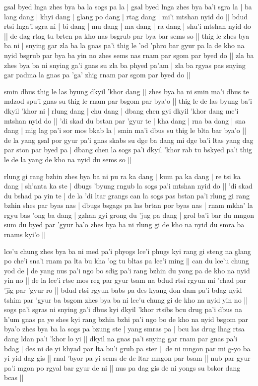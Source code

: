 \documentclass[11pt,twoside]{article}\makeatletter
\begin{document}
\label{TV18.1}gsal byed lnga zhes bya ba la sogs pa la | gsal byed lnga zhes bya ba'i sgra la | ba lang dang | khyi dang | glang po dang | rtag dang | mi'i mtshan nyid do || bdud rtsi lnga'i sgra ni | bi dang | mu dang | ma dang | ra dang | shu'i mtshan nyid do || de dag rtag tu brten pa kho nas bsgrub par bya bar sems so || thig le zhes bya ba ni | snying gar zla ba la gnas pa'i thig le 'od 'phro bar gyur pa la de kho na nyid bsgrub par bya ba yin no zhes sems nas rnam par sgom par byed do || zla ba zhes bya ba ni snying ga'i gnas su zla ba phyed pa'am | zla ba rgyas pas snying gar padma la gnas pa 'ga' zhig rnam par sgom par byed do || \par
\label{TV18.2}smin dbus thig le las byung dkyil 'khor dang || zhes bya ba ni smin ma'i dbus te mdzod spu'i gnas su thig le rnam par bsgom par bya'o || thig le de las byung ba'i dkyil 'khor ni | rlung dang | chu dang | dbang chen gyi dkyil 'khor dang me'i mtshan nyid do || 'di skad du bstan par 'gyur te | kha dang | rna ba dang | sna dang | mig lag pa'i sor mos bkab la | smin ma'i dbus su thig le blta bar bya'o || de la yang gsal por gyur pa'i gnas skabs su dge ba dang mi dge ba'i ltas yang dag par ston par byed pa | dbang chen la sogs pa'i dkyil 'khor rab tu bskyed pa'i thig le de la yang de kho na nyid du sems so || \par
\label{TV18.3}rlung gi rang bzhin zhes bya ba ni pu ra ka dang | kum pa ka dang | re tsi ka dang | sh'anta ka ste | dbugs 'byung rngub la sogs pa'i mtshan nyid do || 'di skad du bshad pa yin te | de la 'di ltar grangs can la sogs pas bstan pa'i rlung gi rang bzhin shes par byas nas | dbugs bsgags pa las brtan por byas nas | rnam mkha' la rgyu bas 'ong ba dang | gzhan gyi grong du 'jug pa dang | grol ba'i bar du mngon sum du byed par 'gyur ba'o zhes bya ba ni rlung gi de kho na nyid du smra ba rnams kyi'o || \par
\label{TV18.4}lce'u chung zhes bya ba ni med pa'i phyogs lce'i phugs kyi rang gi steng na glang po che'i sna'i rnam pa lta bu kha 'og tu bltas pa lce'i ming  || can du lce'u chung yod de | de yang nus pa'i ngo bo sdig pa'i rang bzhin du yong pa de kho na nyid yin no || de la lce'i rtse mos reg par gyur tsam na bdud rtsi rgyun mi 'chad par 'jig par 'gyur ro || bdud rtsi rgyun babs pa des kyang don dam pa'i bdag nyid tshim par 'gyur ba bsgom zhes bya ba ni lce'u chung gi de kho na nyid yin no || sogs pa'i sgras ni snying ga'i dbus kyi dkyil 'khor rtsibs bcu drug pa'i dbus na h'um gnas pa ye shes kyi rang bzhin bzhi pa'i ngo bo de kho na nyid bsgom par bya'o zhes bya ba la sogs pa bzung ste | yang smras pa | bcu las drug lhag rtsa dang ldan pa'i 'khor lo yi || dkyil na gnas pa'i snying gar rnam par gnas pa'i bdag | des ni de yi khyad par lta bu'i grub pa ster || de ni mngon par mi g-yo ba yi yid dag gis || rnal 'byor pa yi sems de de ltar mngon par bsam || nub par gyur pa'i mgon po rgyal bar gyur de ni || nus pa dag gis de ni yongs su bskor dang bcas ||\par
\end{document}
